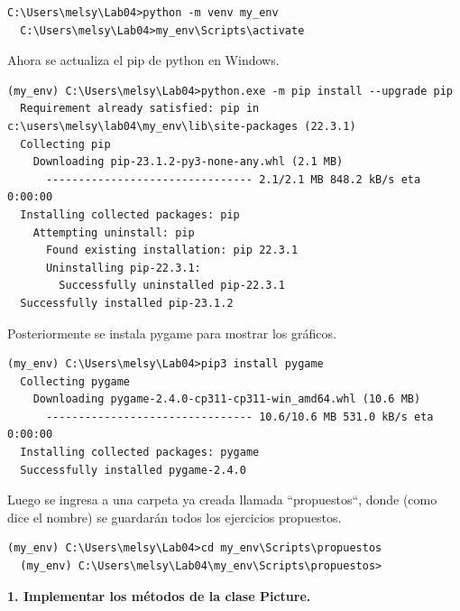 \documentclass{article}
\begin{document}
  \begin{lstlisting}[style=shell]
  C:\Users\melsy\Lab04>python -m venv my_env
  C:\Users\melsy\Lab04>my_env\Scripts\activate
  \end{lstlisting}
  
  \vspace{\baselineskip}

  Ahora se actualiza el pip de python en Windows.

  \begin{lstlisting}[style=shell]
  (my_env) C:\Users\melsy\Lab04>python.exe -m pip install --upgrade pip
  Requirement already satisfied: pip in c:\users\melsy\lab04\my_env\lib\site-packages (22.3.1)
  Collecting pip
    Downloading pip-23.1.2-py3-none-any.whl (2.1 MB)
      -------------------------------- 2.1/2.1 MB 848.2 kB/s eta 0:00:00
  Installing collected packages: pip
    Attempting uninstall: pip
      Found existing installation: pip 22.3.1
      Uninstalling pip-22.3.1:
        Successfully uninstalled pip-22.3.1
  Successfully installed pip-23.1.2
  \end{lstlisting}

  \vspace{\baselineskip}

  Posteriormente se instala pygame para mostrar los gráficos.
  
  \begin{lstlisting}[style=shell]
  (my_env) C:\Users\melsy\Lab04>pip3 install pygame
  Collecting pygame
    Downloading pygame-2.4.0-cp311-cp311-win_amd64.whl (10.6 MB)
      -------------------------------- 10.6/10.6 MB 531.0 kB/s eta 0:00:00
  Installing collected packages: pygame
  Successfully installed pygame-2.4.0
  \end{lstlisting}

  \vspace{\baselineskip}

  Luego se ingresa a una carpeta ya creada llamada ``propuestos``, donde (como dice el nombre) se guardarán todos los ejercicios propuestos.
  
  \begin{lstlisting}[style=shell]
  (my_env) C:\Users\melsy\Lab04>cd my_env\Scripts\propuestos
  (my_env) C:\Users\melsy\Lab04\my_env\Scripts\propuestos>
  \end{lstlisting}

  \vspace{2\baselineskip}

  \textbf{1. Implementar los métodos de la clase Picture.}
\end{document}

